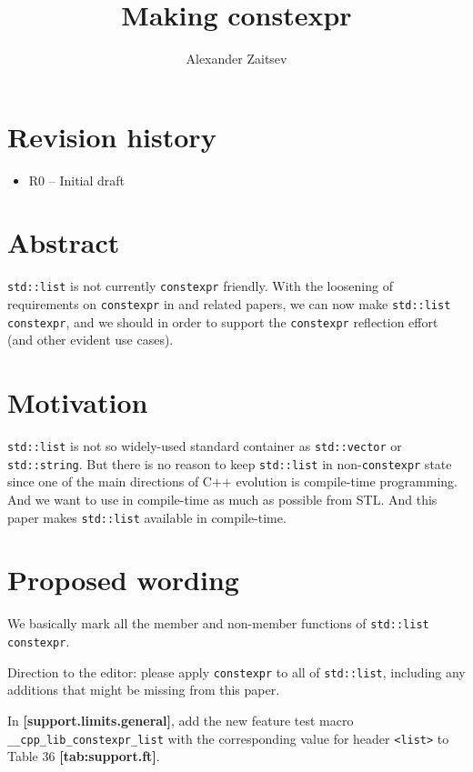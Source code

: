 \documentclass{wg21}
\title{Making \cc{std::list} constexpr}
\author{Alexander Zaitsev}{zamazan4ik@tut.by, zamazan4ik@gmail.com}
\newcommand{\cc}[1]{\texttt{#1}}
\begin{document}
\maketitle

\section{Revision history}
\begin{itemize}
  \item R0 -- Initial draft
\end{itemize}


\section{Abstract}
\cc{std::list} is not currently \cc{constexpr} friendly. With the loosening
of requirements on \cc{constexpr} in \cite{P0784R1} and related papers, we
can now make \cc{std::list} \cc{constexpr}, and we should in order to support
the \cc{constexpr} reflection effort (and other evident use cases).

\section{Motivation}
\cc{std::list} is not so widely-used standard container as \cc{std::vector} or \cc{std::string}. But there is no reason to keep \cc{std::list} in non-\cc{constexpr} state since one of the main directions of C++ evolution is compile-time programming. And we want to use in compile-time as much as possible from STL. And this paper makes \cc{std::list} available in compile-time.

\section{Proposed wording}
We basically mark all the member and non-member functions of \cc{std::list} \cc{constexpr}.

Direction to the editor: please apply \cc{constexpr} to all of \cc{std::list},
including any additions that might be missing from this paper.

In \textbf{[support.limits.general]}, add the new feature test macro
\cc{__cpp_lib_constexpr_list} with the corresponding value for header
\cc{<list>} to Table 36 \textbf{[tab:support.ft]}.
\end{document}
